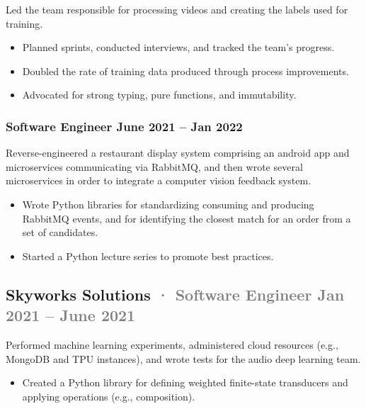 \documentclass[12pt]{article} %
\providecommand{\tightlist}{%
  \setlength{\itemsep}{0pt}\setlength{\parskip}{0pt}}
\renewcommand{\emph}[1]{%
  \textcolor{gray}{#1}%
}
\begin{document}
Led the team responsible for processing videos and creating the labels
used for training.

\begin{itemize}
\tightlist
\item
  Planned sprints, conducted interviews, and tracked the team's
  progress.
\item
  Doubled the rate of training data produced through process
  improvements.
\item
  Advocated for strong typing, pure functions, and immutability.
\end{itemize}

\hypertarget{software-engineer-june-2021-jan-2022}{%
\subsubsection{\texorpdfstring{\small Software Engineer \hfill June 2021
-- Jan
2022}{Software Engineer June 2021 -- Jan 2022}}\label{software-engineer-june-2021-jan-2022}}

Reverse-engineered a restaurant display system comprising an android app
and microservices communicating via RabbitMQ, and then wrote several
microservices in order to integrate a computer vision feedback system.

\begin{itemize}
\tightlist
\item
  Wrote Python libraries for standardizing consuming and producing
  RabbitMQ events, and for identifying the closest match for an order
  from a set of candidates.
\item
  Started a Python lecture series to promote best practices.
\end{itemize}

\hypertarget{skyworks-solutions-software-engineer-jan-2021-june-2021}{%
\subsection{\texorpdfstring{Skyworks Solutions \emph{· \small Software
Engineer \hfill Jan 2021 -- June
2021}}{Skyworks Solutions · Software Engineer Jan 2021 -- June 2021}}\label{skyworks-solutions-software-engineer-jan-2021-june-2021}}

Performed machine learning experiments, administered cloud resources
(e.g., MongoDB and TPU instances), and wrote tests for the audio deep
learning team.

\begin{itemize}
\tightlist
\item
  Created a Python library for defining weighted finite-state
  transducers and applying operations (e.g., composition).
\end{itemize}
\end{document}
